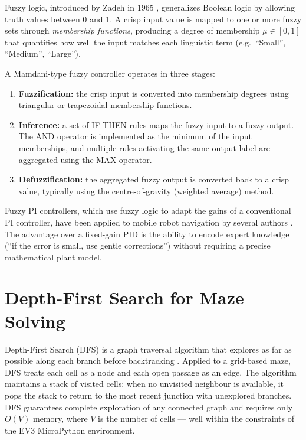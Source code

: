 Fuzzy logic, introduced by Zadeh in 1965 \cite{zadeh1965}, generalizes Boolean logic by allowing truth values between 0 and 1. A crisp input value is mapped to one or more fuzzy sets through \textit{membership functions}, producing a degree of membership $\mu \in [0,1]$ that quantifies how well the input matches each linguistic term (e.g.\ ``Small'', ``Medium'', ``Large'').

A Mamdani-type fuzzy controller \cite{mamdani1975} operates in three stages:

\begin{enumerate}
    \item \textbf{Fuzzification:} the crisp input is converted into
     membership degrees using triangular or trapezoidal membership functions.
    \item \textbf{Inference:} a set of IF-THEN rules maps the fuzzy input to a fuzzy output. The AND operator is implemented as the minimum of the input memberships, and multiple rules activating the same output label are aggregated using the MAX operator.
    \item \textbf{Defuzzification:} the aggregated fuzzy output is converted back to a crisp value, typically using the centre-of-gravity (weighted average) method.
\end{enumerate}

Fuzzy PI controllers, which use fuzzy logic to adapt the gains of a conventional PI controller, have been applied to mobile robot navigation by several authors \cite{lee1990, passino1998}. The advantage over a fixed-gain PID is the ability to encode expert knowledge (``if the error is small, use gentle corrections'') without requiring a precise mathematical plant model.

\section{Depth-First Search for Maze Solving}
\label{sec:sota-dfs}

Depth-First Search (DFS) is a graph traversal algorithm that explores as far as possible along each branch before backtracking \cite{cormen2009}. Applied to a grid-based maze, DFS treats each cell as a node and each open passage as an edge. The algorithm maintains a stack of visited cells: when no unvisited neighbour is available, it pops the stack to return to the most recent junction with unexplored branches. DFS guarantees complete exploration of any connected graph and requires only $O(V)$ memory, where $V$ is the number of cells — well within the constraints of the EV3 MicroPython environment.


